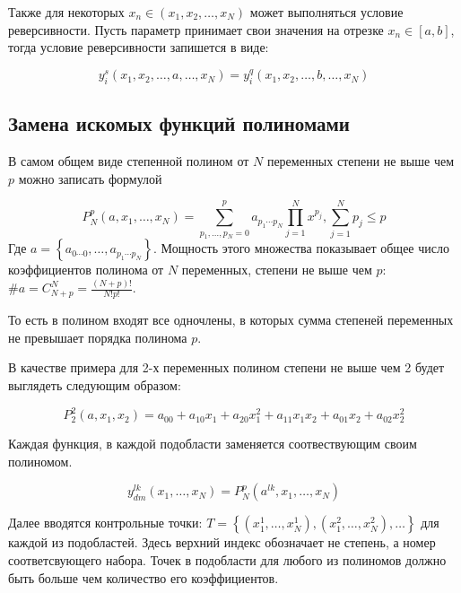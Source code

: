 \documentclass[a4paper,12pt]{article}
\begin{document}
  Также для некоторых $x_n \in \left(x_1,x_2,\ldots,x_N\right)$ может
  выполняться условие реверсивности. Пусть параметр принимает свои
  значения на отрезке $x_n \in [a,b]$, тогда условие реверсивности запишется в виде:

  \begin{equation}
    y_i^s\left(x_1,x_2,\ldots,a,\ldots,x_N\right) = y_i^q\left(x_1,x_2,\ldots,b,\ldots,x_N\right)
  \end{equation}


  \subsection{Замена искомых функций полиномами}


  В самом общем виде степенной полином от $N$ переменных степени не выше чем $p$ можно
  записать формулой
  
  \begin{equation}
    P_N^p(a,x_1,\ldots,x_N)=
    \displaystyle\sum_{p_1,\ldots,p_N=0}^{p}a_{p_1 \cdots p_N}\prod_{j=1}^{N}x^{p_j},
    \displaystyle\sum_{j=1}^{N}p_j \le p
  \end{equation}
  Где $a = \left\{ a_{0 \cdots 0},\ldots,a_{p_1 \cdots p_N} \right\}$.
  Мощность этого множества показывает общее число
  коэффициентов полинома от $N$ переменных, степени не выше чем $p$:
  $ \#a = C_{N+p}^N = \frac{(N+p)!}{N!p!}$.
  
  То есть в полином входят все одночлены, в которых сумма степеней
  переменных не превышает порядка полинома $p$.

  В качестве примера для 2-х переменных полином степени не выше чем 2
  будет выглядеть следующим образом:

  \begin{equation*}
    P_2^2(a,x_1,x_2) = a_{00} + a_{10}x_1 + a_{20}x_1^2+ a_{11}x_1x_2 + a_{01}x_2 + a_{02}x_2^2
  \end{equation*}

  Каждая функция, в каждой подобласти заменяется соотвествующим своим
  полиномом.

  \begin{equation}
    y_{dm}^{lk}(x_1,\ldots,x_N) = P_N^p(a^{lk},x_1,\ldots,x_N)
  \end{equation}

  Далее вводятся контрольные точки:
  $T=\left\{(x_1^1,\ldots,x_N^1),(x_1^2,\ldots,x_N^2),\ldots\right\}$
  для каждой из подобластей. Здесь верхний индекс обозначает не
  степень, а номер соответсвующего набора. Точек в подобласти для
  любого из полиномов должно быть больше чем количество его
  коэффициентов.
\end{document}
